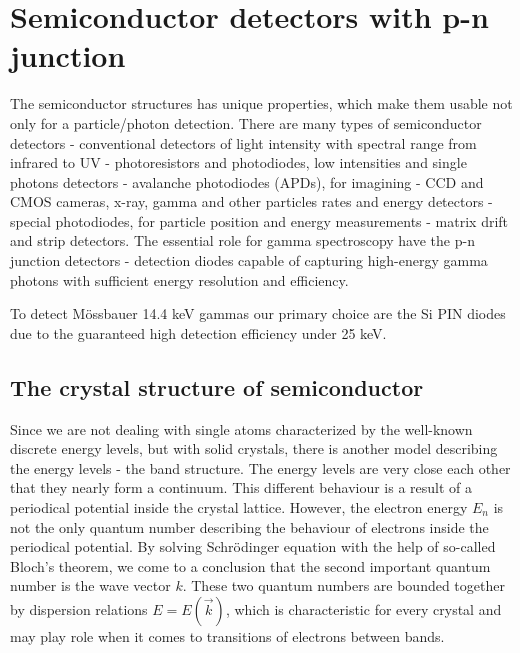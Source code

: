 
\chapter{Semiconductor detectors with p-n junction}
The semiconductor structures has unique properties, which make them usable not only for a particle/photon detection. There are many types of semiconductor detectors - conventional detectors of light intensity with spectral range from infrared to UV - photoresistors and photodiodes, low intensities and single photons detectors - avalanche photodiodes (APDs), for imagining - CCD and CMOS cameras, x-ray, gamma and other particles rates and energy detectors - special photodiodes, for particle position and energy measurements - matrix drift and strip detectors. The essential role for gamma spectroscopy have the p-n junction detectors - detection diodes capable of capturing high-energy gamma photons with sufficient energy resolution and efficiency.

\par
To detect Mössbauer 14.4 keV gammas our primary choice are the Si PIN diodes due to the guaranteed high detection efficiency under 25 keV. 

\section{The crystal structure of semiconductor}
Since we are not dealing with single atoms characterized by the well-known discrete energy levels, but with solid crystals, there is another  model describing the energy levels - the band structure. The energy levels are very close each other that they nearly form a continuum. This different behaviour is a result of a periodical potential inside the crystal lattice. However, the electron energy $E_{n}$ is not the only quantum number describing the behaviour of electrons inside the periodical potential. By solving Schrödinger equation with the help of so-called Bloch's theorem, we come to a conclusion that the second important quantum number is the wave vector $k$. These two quantum numbers are bounded together by dispersion relations $E = E(\vec{k})$, which is characteristic for every crystal and may play role when it comes to transitions of electrons between bands.

